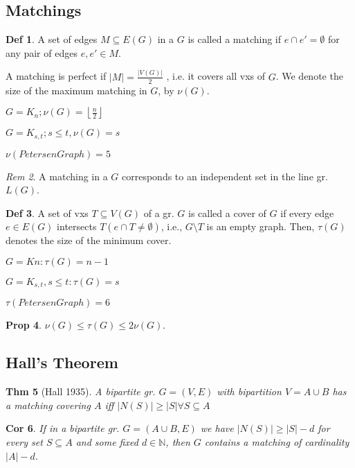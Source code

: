 \documentclass[11pt, fleqn, a4paper, landscape]{article}
\theoremstyle{plain} %
\newtheorem{thm}{Thm}
\newtheorem{pro}[thm]{Prop}
\newtheorem{cor}[thm]{Cor}
\theoremstyle{remark} %
\newtheorem{rem}[thm]{Rem}
\theoremstyle{definition} %
\newtheorem{defi}[thm]{Def}
\begin{document}
\begin{multicols}{5}
\section{Matchings}
\begin{defi}
A set of edges $M \subseteq E(G)$ in a $G$ is called a matching if $e \cap e' = \emptyset$ for any pair of edges $e, e' \in M$.

A matching is perfect if $|M|=\frac{|V (G)|}{2}$ , i.e. it covers all vxs of $G$. We denote the size of the maximum matching in $G$, by $\nu(G)$.

$G=K_n; \nu(G)=\left\lfloor\frac{n}{2}\right\rfloor$

$G=K_{s,t}; s\le t, \nu(G)=s$

$\nu(Petersen Graph)=5$
\end{defi}
\addtocounter{thm}{1}
\begin{rem}
A matching in a $G$ corresponds to an independent set in the line gr. $L(G)$.
\end{rem}
\begin{defi}
A set of vxs $T \subseteq V (G)$ of a gr.  $G$ is called a cover of $G$ if every edge $e \in E(G)$ intersects $T (e \cap T \neq \emptyset)$, i.e., $G \setminus T$ is an empty graph. Then, $\tau(G)$ denotes the size of
the minimum cover.

$G = Kn: \tau(G) = n - 1$

$G = K_{s,t}, s \le t: \tau(G) = s$

$\tau(Petersen Graph)=6$
\end{defi}
\addtocounter{thm}{1}
\begin{pro}
$\nu(G) \le\tau(G) \le 2\nu(G).$
\end{pro}
\addtocounter{subsection}{1}
\subsection{Hall’s Theorem}
\begin{thm}[Hall 1935]
A bipartite gr. $G = (V,E)$ with bipartition $V = A\cup B$ has a matching
covering $A$ iff $|N(S)|\ge|S|\forall S \subseteq A$
\end{thm}

\begin{cor}
 If in a bipartite gr. $G = (A\cup B,E)$ we have $|N(S)|\ge|S|-d$ for every set $S \subseteq A$ and some fixed $d\in\mathbb{N}$, then $G$ contains a matching of cardinality $|A|- d$.
\end{cor}


\end{multicols}
\end{document}
